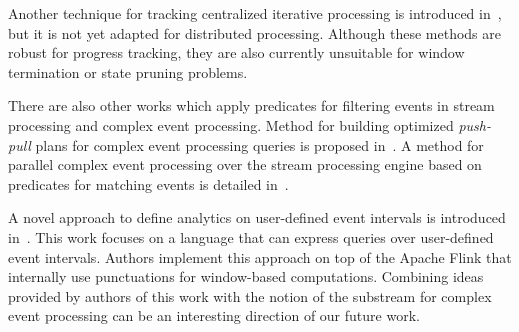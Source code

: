 Another technique for tracking centralized iterative processing is introduced in~\cite{chandramouli2014trill}, but it is not yet adapted for distributed processing. Although these methods are robust for progress tracking, they are also currently unsuitable for window termination or state pruning problems.

There are also other works which apply predicates for filtering events in stream processing and complex event processing. Method for building optimized {\em push-pull} plans for complex event processing queries is proposed in~\cite{purtzel2022predicate}. A method for parallel complex event processing over the stream processing engine based on predicates for matching events is detailed in~\cite{hirzel2012partition}.

A novel approach to define analytics on user-defined event intervals is introduced in~\cite{awad2022d2ia}. This work focuses on a language that can express queries over user-defined event intervals. Authors implement this approach on top of the Apache Flink that internally use punctuations for window-based computations. Combining ideas provided by authors of this work with the notion of the substream for complex event processing can be an interesting direction of our future work.



